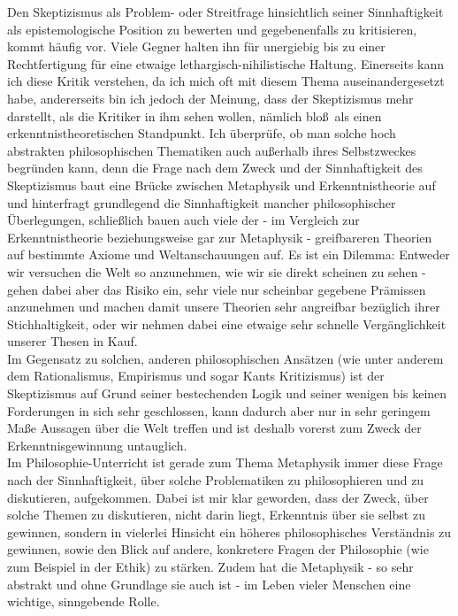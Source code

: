 \documentclass[12pt,a4paper,final]{article}
\begin{document}
Den Skeptizismus als Problem- oder Streitfrage hinsichtlich seiner Sinnhaftigkeit als epistemologische Position zu bewerten und gegebenenfalls zu kritisieren, kommt häufig vor. Viele Gegner halten ihn für unergiebig bis zu einer Rechtfertigung für eine etwaige lethargisch-nihilistische Haltung. Einerseits kann ich diese Kritik verstehen, da ich mich oft mit diesem Thema auseinandergesetzt habe, andererseits bin ich jedoch der Meinung, dass der Skeptizismus mehr darstellt, als die Kritiker in ihm sehen wollen, nämlich \glqq bloß\grqq\ als einen erkenntnistheoretischen Standpunkt. %
Ich überprüfe, ob man solche hoch abstrakten philosophischen Thematiken auch außerhalb ihres Selbstzweckes begründen kann, %
denn die Frage nach dem Zweck und der Sinnhaftigkeit des Skeptizismus baut eine Brücke zwischen Metaphysik und Erkenntnistheorie auf und hinterfragt grundlegend die Sinnhaftigkeit mancher philosophischer Überlegungen, schließlich bauen auch viele der - im Vergleich zur Erkenntnistheorie beziehungsweise gar zur Metaphysik - greifbareren Theorien auf bestimmte Axiome und Weltanschauungen auf. Es ist ein Dilemma: Entweder wir versuchen die Welt so anzunehmen, wie wir sie direkt scheinen zu sehen - gehen dabei aber das Risiko ein, sehr viele nur scheinbar gegebene Prämissen anzunehmen und machen damit unsere Theorien sehr angreifbar bezüglich ihrer Stichhaltigkeit, oder wir nehmen dabei eine etwaige sehr schnelle Vergänglichkeit unserer Thesen in Kauf.\\
Im Gegensatz zu solchen, anderen philosophischen Ansätzen (wie unter anderem dem Rationalismus, Empirismus und sogar Kants Kritizismus) ist der Skeptizismus auf Grund seiner bestechenden Logik und seiner wenigen bis keinen Forderungen in sich sehr geschlossen, kann dadurch aber nur in sehr geringem Maße Aussagen über die Welt treffen und ist deshalb vorerst zum Zweck der Erkenntnisgewinnung untauglich.\\ %

%
%
Im Philosophie-Unterricht ist gerade zum Thema Metaphysik immer diese Frage nach der Sinnhaftigkeit, über solche Problematiken zu philosophieren und zu diskutieren, aufgekommen. %
Dabei ist mir klar geworden, dass der Zweck, über solche Themen zu diskutieren, nicht darin liegt, Erkenntnis über sie selbst zu gewinnen, sondern in vielerlei Hinsicht ein höheres philosophisches Verständnis zu gewinnen, sowie den Blick auf andere, konkretere Fragen der Philosophie (wie zum Beispiel in der Ethik) zu stärken. Zudem hat die Metaphysik - so sehr abstrakt und ohne Grundlage sie auch ist - im Leben vieler Menschen eine wichtige, sinngebende Rolle.
\end{document}
